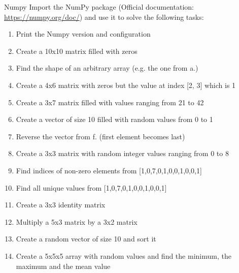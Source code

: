 \documentclass[twoside]{article}
\begin{document}
\newpage
\begin{task}{Numpy}{}{}
Import the NumPy package (Official documentation: \href{https://numpy.org/doc/}{https://numpy.org/doc/}) and use it to solve the following tasks:

\begin{enumerate}
    \item Print the Numpy version and configuration
    \item Create a 10x10 matrix filled with zeros
    \item Find the shape of an arbitrary array (e.g. the one from a.)
    \item Create a 4x6 matrix with zeros but the value at index [2, 3] which is 1
    \item Create a 3x7 matrix filled with values ranging from 21 to 42
    \item Create a vector of size 10 filled with random values from 0 to 1
    \item Reverse the vector from f. (first element becomes last)
    \item Create a 3x3 matrix with random integer values ranging from 0 to 8
    \item Find indices of non-zero elements from [1,0,7,0,1,0,0,1,0,0,1]
    \item Find all unique values from [1,0,7,0,1,0,0,1,0,0,1]
    \item Create a 3x3 identity matrix
    \item Multiply a 5x3 matrix by a 3x2 matrix
    \item Create a random vector of size 10 and sort it
    \item Create a 5x5x5 array with random values and find the minimum, the maximum and the mean value
\end{enumerate}
\end{task}


\clearpage
\end{document}
